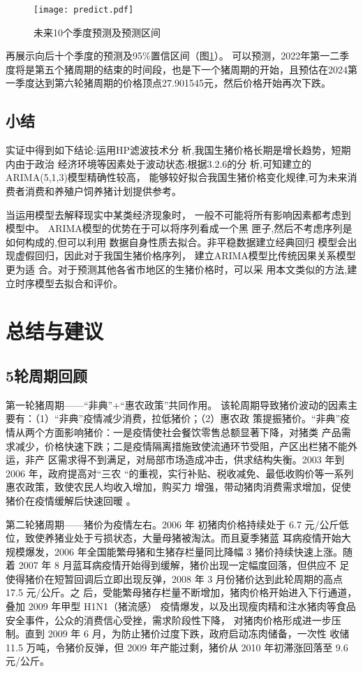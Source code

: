 \documentclass[a4paper,AutoFakeBold,AutoFakeSlant]{ctexart}
\begin{document}
\begin{figure}[H]
  \centering
  \texttt{[image: predict.pdf]}
  \caption{未来10个季度预测及预测区间}
  \label{f14}
\end{figure}

再展示向后十个季度的预测及95\%置信区间（图\ref{f14}）。
可以预测，2022年第一二季度将是第五个猪周期的结束的时间段，也是下一个猪周期的开始，且预估在2024第一季度达到第六轮猪周期的价格顶点27.901545元，然后价格开始再次下跌。


\subsection{小结}

实证中得到如下结论:运用HP滤波技术分
析,我国生猪价格长期是增长趋势，短期内由于政治
经济环境等因素处于波动状态;根据3.2.6的分
析,可知建立的ARIMA(5,1,3)模型精确性较高，
能够较好拟合我国生猪价格变化规律,可为未来消费者消费和养殖户饲养猪计划提供参考。

当运用模型去解释现实中某类经济现象时，
一般不可能将所有影响因素都考虑到模型中。
ARIMA模型的优势在于可以将序列看成一个黑
匣子,然后不考虑序列是如何构成的,但可以利用
数据自身性质去拟合。非平稳数据建立经典回归
模型会出现虚假回归，因此对于我国生猪价格序列，
建立ARIMA模型比传统因果关系模型更为适
合。对于预测其他各省市地区的生猪价格时，可以采
用本文类似的方法,建立时序模型去拟合和评价。\cite{基于HP滤波和ARIMA模型的我国GDP分析与预测}



\section{总结与建议}

\subsection{5轮周期回顾}

第一轮猪周期——“非典”+“惠农政策”共同作用。
该轮周期导致猪价波动的因素主要有：（1）“非典”疫情减少消费，拉低猪价；（2）惠农政
策提振猪价。“非典”疫情从两个方面影响猪价：一是疫情使社会餐饮零售总额显著下降，对猪类
产品需求减少，价格快速下跌；二是疫情隔离措施致使流通环节受阻，产区出栏猪不能外运，非产
区需求得不到满足，对局部市场造成冲击，供求结构失衡。2003 年到 2006 年，政府提高对“三农
“的重视，实行补贴、税收减免、最低收购价等一系列惠农政策，致使农民人均收入增加，购买力
增强，带动猪肉消费需求增加，促使猪价在疫情缓解后快速回暖 。

第二轮猪周期——猪价为疫情左右。2006 年
初猪肉价格持续处于 6.7 元/公斤低位，致使养猪业处于亏损状态，大量母猪被淘汰。而且夏季猪蓝
耳病疫情开始大规模爆发，2006 年全国能繁母猪和生猪存栏量同比降幅 3%
猪价持续快速上涨。随着 2007 年 8 月蓝耳病疫情开始得到缓解，猪价出现一定幅度回落，但供应不
足使得猪价在短暂回调后立即出现反弹，2008 年 3 月份猪价达到此轮周期的高点 17.5 元/公斤。之
后，受能繁母猪存栏量不断增加，猪肉价格开始进入下行通道，叠加 2009 年甲型 H1N1（猪流感）
疫情爆发，以及出现瘦肉精和注水猪肉等食品安全事件，公众的消费信心受挫，需求阶段性下降，
对猪肉价格形成进一步压制。直到 2009 年 6 月，为防止猪价过度下跌，政府启动冻肉储备，一次性
收储 11.5 万吨，令猪价反弹，但 2009 年产能过剩，猪价从 2010 年初滞涨回落至 9.6 元/公斤。
\end{document}
